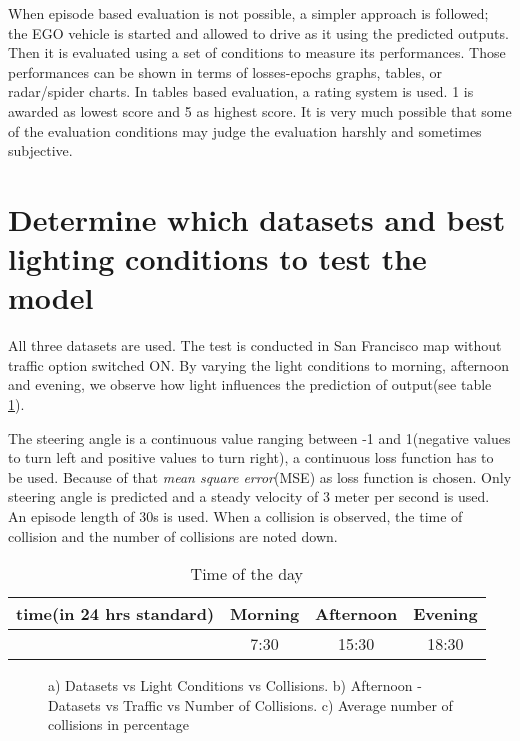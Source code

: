When episode based evaluation is not possible, a simpler approach is followed; the EGO
vehicle is started and allowed to drive as it using the predicted outputs. Then it is
evaluated using a set of conditions to measure its performances. Those performances can be
shown in terms of losses-epochs graphs, tables, or radar/spider charts.  In tables based evaluation, a rating system is used. 1 is awarded
as lowest score and 5 as highest score. It is very much possible that some of the evaluation conditions may judge the evaluation harshly and
sometimes subjective.
\section{Determine which datasets and best lighting conditions to test the model}
\label{chapter05subsec:setup1}
All three datasets are used. The test is conducted in San Francisco map without traffic
option switched ON. By varying the light conditions to morning, afternoon and evening, we
observe how light influences the prediction of output(see table \ref{table:timeoftheday}).

The steering angle is a continuous value ranging between -1 and 1(negative values to
turn left and positive values to turn right), a continuous loss function has to be used.
Because of that \textit{mean square error}(MSE) as loss function is chosen.
Only steering angle is predicted
and a steady velocity of 3 meter per second is used. An episode length of 30s is used.
When a collision is observed, the time of collision and the number of collisions are noted down.
\begin{table}[!ht]
    \centering
\begin{tabular}{cccc}
    \toprule
    time(in 24 hrs standard) & Morning & Afternoon & Evening \\\midrule
      & 7:30 & 15:30 & 18:30 \\\bottomrule
\end{tabular}
\caption{Time of the day}
\label{table:timeoftheday}
\end{table}

\begin{figure}[!ht]
	\centering
    \def\svgwidth{0.9\textwidth}
    \caption{a) Datasets vs Light Conditions vs Collisions.
        b) Afternoon - Datasets vs Traffic vs Number of Collisions.
    c) Average number of collisions in percentage}
    \label{fig:dsvslcvstrafficAll}
\end{figure}

